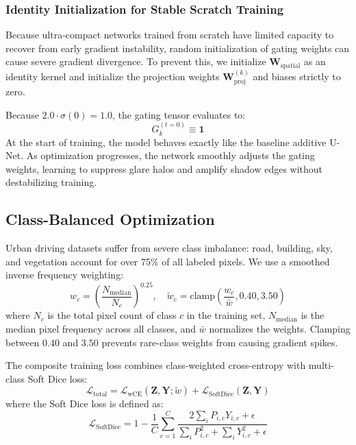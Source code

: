 \documentclass[conference]{IEEEtran}
\begin{document}
\subsubsection{Identity Initialization for Stable Scratch Training}
Because ultra-compact networks trained from scratch have limited capacity to recover from early gradient instability, random initialization of gating weights can cause severe gradient divergence. To prevent this, we initialize $\mathbf{W}_{\text{spatial}}$ as an identity kernel and initialize the projection weights $\mathbf{W}_{\text{proj}}^{(k)}$ and biases strictly to zero. 

Because $2.0 \cdot \sigma(0) = 1.0$, the gating tensor evaluates to:
\begin{equation}
G_k^{(t=0)} \equiv \mathbf{1}
\end{equation}
At the start of training, the model behaves exactly like the baseline additive U-Net. As optimization progresses, the network smoothly adjusts the gating weights, learning to suppress glare halos and amplify shadow edges without destabilizing training.

\subsection{Class-Balanced Optimization}
Urban driving datasets suffer from severe class imbalance: road, building, sky, and vegetation account for over 75\% of all labeled pixels. We use a smoothed inverse frequency weighting:
\begin{equation}
w_c = \left(\frac{N_{\text{median}}}{N_c}\right)^{0.25}, \quad \tilde{w}_c = \text{clamp}\left(\frac{w_c}{\bar{w}}, 0.40, 3.50\right)
\end{equation}
where $N_c$ is the total pixel count of class $c$ in the training set, $N_{\text{median}}$ is the median pixel frequency across all classes, and $\bar{w}$ normalizes the weights. Clamping between $0.40$ and $3.50$ prevents rare-class weights from causing gradient spikes.

The composite training loss combines class-weighted cross-entropy with multi-class Soft Dice loss:
\begin{equation}
\mathcal{L}_{\text{total}} = \mathcal{L}_{\text{wCE}}(\mathbf{Z}, \mathbf{Y}; \tilde{w}) + \mathcal{L}_{\text{SoftDice}}(\mathbf{Z}, \mathbf{Y})
\end{equation}
where the Soft Dice loss is defined as:
\begin{equation}
\mathcal{L}_{\text{SoftDice}} = 1 - \frac{1}{C} \sum_{c=1}^C \frac{2 \sum_{i} P_{i,c} Y_{i,c} + \epsilon}{\sum_i P_{i,c}^2 + \sum_i Y_{i,c}^2 + \epsilon}
\end{equation}
\end{document}
